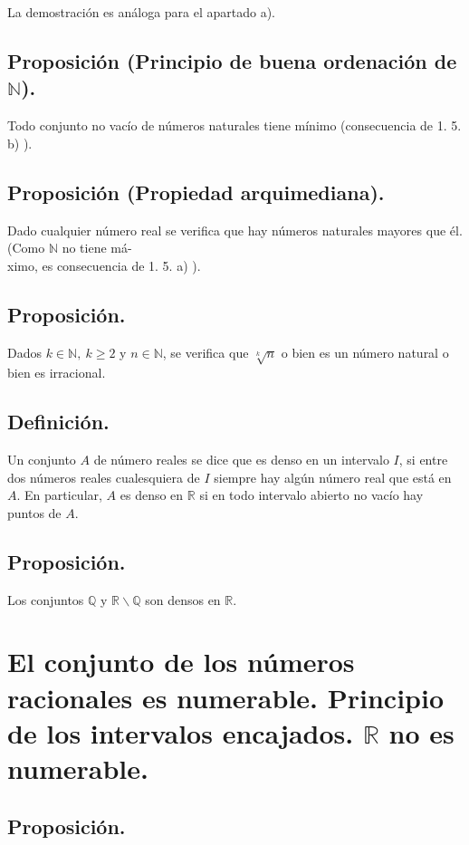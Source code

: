 \documentclass[10pt,a4paper]{article}
\begin{document}
		La demostración es análoga para el apartado a).
		
		\subsection{Proposición (Principio de buena ordenación de $\mathbb{N}$).}
		
		Todo conjunto no vacío de números naturales tiene mínimo (consecuencia de 1. 5. b) ).
		
		\subsection{Proposición (Propiedad arquimediana).}
		
		Dado cualquier número real se verifica que hay números naturales mayores que él. (Como $\mathbb{N}$ no tiene má- \\ximo, es consecuencia de 1. 5. a) ).
		
		\subsection{Proposición.}
		Dados $k \in \mathbb{N},~k \geq 2$ y $n \in \mathbb{N}$, se verifica que $\sqrt[k]{n}$ o bien es un número natural o bien es irracional.
		
		\subsection{Definición.}
		
		Un conjunto $A$ de número reales se dice que es denso en un intervalo $I$, si entre dos números reales cualesquiera de $I$ siempre hay algún número real que está en $A$. En particular, $A$ es denso en $\mathbb{R}$ si en todo intervalo abierto no vacío hay puntos de $A$.
		
		\subsection{Proposición.}
		
		Los conjuntos $\mathbb{Q}$ y $ \mathbb{R} \backslash \mathbb{Q}$ son densos en $\mathbb{R}$.
	\newpage
	\section{El conjunto de los números racionales es numerable. Principio de los intervalos encajados. $\mathbb{R}$ no es numerable.}
	
	\subsection{Proposición.}
	
\end{document}
